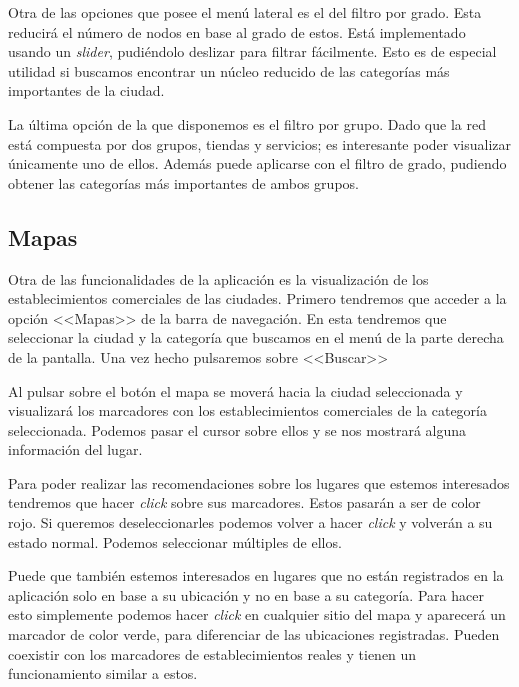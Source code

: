 Otra de las opciones que posee el menú lateral es el del filtro por grado. Esta reducirá el número de nodos en base al grado de estos. Está implementado usando un \textit{slider}, pudiéndolo deslizar para filtrar fácilmente. Esto es de especial utilidad si buscamos encontrar un núcleo reducido de las categorías más importantes de la ciudad.


La última opción de la que disponemos es el filtro por grupo. Dado que la red está compuesta por dos grupos, tiendas y servicios; es interesante poder visualizar únicamente uno de ellos. Además puede aplicarse con el filtro de grado, pudiendo obtener las categorías más importantes de ambos grupos.


\subsection{Mapas}

Otra de las funcionalidades de la aplicación es la visualización de los establecimientos comerciales de las ciudades. Primero tendremos que acceder a la opción <<Mapas>> de la barra de navegación. En esta tendremos que seleccionar la ciudad y la categoría que buscamos en el menú de la parte derecha de la pantalla. Una vez hecho pulsaremos sobre <<Buscar>>


Al pulsar sobre el botón el mapa se moverá hacia la ciudad seleccionada y visualizará los marcadores con los establecimientos comerciales de la categoría seleccionada. Podemos pasar el cursor sobre ellos y se nos mostrará alguna información del lugar.


Para poder realizar las recomendaciones sobre los lugares que estemos interesados tendremos que hacer \textit{click} sobre sus marcadores. Estos pasarán a ser de color rojo. Si queremos deseleccionarles podemos volver a hacer \textit{click} y volverán a su estado normal. Podemos seleccionar múltiples de ellos.


Puede que también estemos interesados en lugares que no están registrados en la aplicación solo en base a su ubicación y no en base a su categoría. Para hacer esto simplemente podemos hacer \textit{click} en cualquier sitio del mapa y aparecerá un marcador de color verde, para diferenciar de las ubicaciones registradas. Pueden coexistir con los marcadores de establecimientos reales y tienen un funcionamiento similar a estos.

